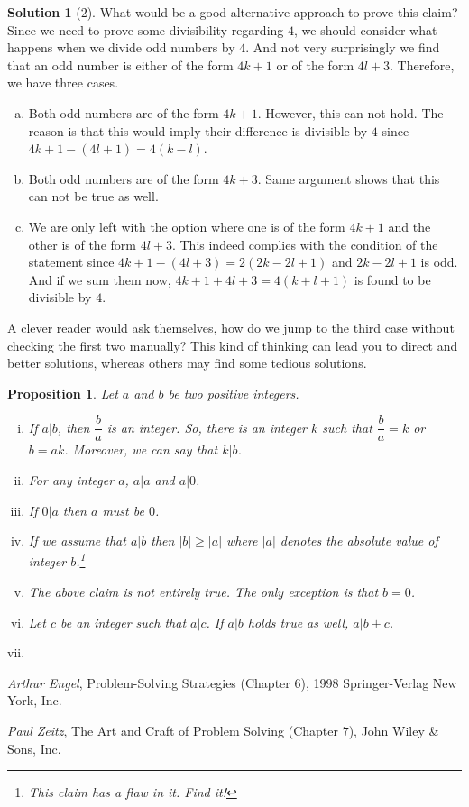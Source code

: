 \documentclass[a4paper, 12pt, leqno]{article}
\newtheorem{proposition}{Proposition}
\theoremstyle{definition}
\newtheorem*{solution}{Solution}
\theoremstyle{remark}
\begin{document}
		\begin{solution}[$2$]
			What would be a good alternative approach to prove this claim? Since we need to prove some divisibility regarding $4$, we should consider what happens when we divide odd numbers by $4$. And not very surprisingly we find that an odd number is either of the form $4k+1$ or of the form $4l+3$. Therefore, we have three cases.
				\begin{enumerate}[(a)]
					\item Both odd numbers are of the form $4k+1$. However, this can not hold. The reason is that this would imply their difference is divisible by $4$ since $4k+1-(4l+1)=4(k-l)$.
					\item Both odd numbers are of the form $4k+3$. Same argument shows that this can not be true as well.
					\item We are only left with the option where one is of the form $4k+1$ and the other is of the form $4l+3$. This indeed complies with the condition of the statement since $4k+1-(4l+3)=2(2k-2l+1)$ and $2k-2l+1$ is odd. And if we sum them now, $4k+1+4l+3=4(k+l+1)$ is found to be divisible by $4$.
				\end{enumerate}
		\end{solution}
	A clever reader would ask themselves, how do we jump to the third case without checking the first two manually? This kind of thinking can lead you to direct and better solutions, whereas others may find some tedious solutions.
		\begin{proposition}
			Let $a$ and $b$ be two positive integers.
				\begin{enumerate}[i.]
					\item If $a|b$, then $\dfrac{b}{a}$ is an integer. So, there is an integer $k$ such that $\dfrac{b}{a}=k$ or $b=ak$. Moreover, we can say that $k|b$.
					\item For any integer $a$, $a|a$ and $a|0$.
					\item If $0|a$ then $a$ must be $0$.
					\item If we assume that $a|b$ then $|b|\geq |a|$ where $|a|$ denotes the absolute value of integer $b$.\footnote{This claim has a flaw in it. Find it!}
					\item The above claim is not entirely true. The only exception is that $b=0$.
					\item Let $c$ be an integer such that $a|c$. If $a|b$ holds true as well, $a|b\pm c$.
					\item 
				\end{enumerate}
		\end{proposition}
	\begin{thebibliography}{99}
		 \textit{Arthur Engel}, Problem-Solving Strategies (Chapter $6$), 1998 Springer-Verlag New York, Inc.
		
		 \textit{Paul Zeitz}, The Art and Craft of Problem Solving (Chapter $7$), John Wiley \& Sons, Inc.
		
	\end{thebibliography}
\end{document}
